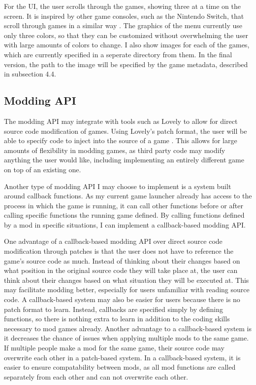 \documentclass[10pt,twocolumn]{article}
\begin{document}
For the UI, the user scrolls through the games, showing three at a time on the
screen. It is inspired by other game consoles, such as the Nintendo Switch, that
scroll through games in a similar way \cite{noauthor_nintendo_nodate}. The
graphics of the menu currently use only three colors, so that they can be
customized without overwhelming the user with large amounts of colors to change.
I also show images for each of the games, which are currently specified in a
seperate directory from them. In the final version, the path to the image will
be specified by the game metadata, described in subsection 4.4.

\subsection{Modding API}

The modding API may integrate with tools such as Lovely
to allow for direct
source code modification of games. Using Lovely's patch format,
the user will be
able to specify code to inject into the source of a game
\cite{green_ethangreen-devlovely-injector_2025}. This allows for large
amounts of flexibility in modding games, as third party code may modify anything
the user would like, including implementing an entirely different game on top of
an existing one.

Another type of modding API I may choose to implement is a system built around
callback functions. As my current game launcher already has access to the
process in which the game is running, it can call other functions before or
after calling specific functions the running game defined. By calling functions
defined by a mod in specific situations, I can implement a callback-based
modding API.

One advantage of a callback-based modding API over direct source code
modification through patches is that the user does not have to reference the
game's source code as much. Instead of thinking about their changes based on
what position in the original source code they will take place at, the user can
think about their changes based on what situation they will be executed at. This
may facilitate modding better, especially for users unfamiliar with reading
source code. A callback-based system may also be easier for users because there
is no patch format to learn. Instead, callbacks are specified simply by defining
functions, so there is nothing extra to learn in addition to the coding skills
necessary to mod games already. Another advantage to a callback-based system is
it decreases the chance of issues when applying multiple mods to the same game.
If multiple people make a mod for the same game, their source code may overwrite
each other in a patch-based system. In a callback-based system, it is easier to
ensure compatability between mods, as all mod functions are called separately
from each other and can not overwrite each other.
\end{document}
